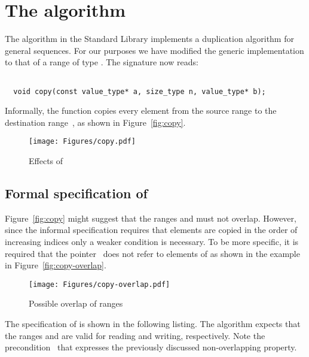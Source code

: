 
\section{The \copyi algorithm}

The \copyi  algorithm in the \cxx Standard Library \cite[\S 28.6.1]{cxx-17-draft} implements
a duplication algorithm for general sequences.
For our purposes we have modified
the generic implementation
to that of a range of type .
The signature now reads:

\begin{lstlisting}[style=acsl-block]

  void copy(const value_type* a, size_type n, value_type* b);
\end{lstlisting}

Informally, the function copies every element from the source range  to the
destination range~, as shown in Figure~\ref{fig:copy}.

\begin{figure}[hbt]
\centering
\texttt{[image: Figures/copy.pdf]}
\caption{ Effects of \copyi}
\end{figure}

\subsection{Formal specification of \copyi}

Figure~\ref{fig:copy} might suggest that the ranges  and 
must not overlap.
However, since the informal specification requires that elements are copied in the
order of increasing indices only a weaker condition is necessary.
To be more specific, it is required that the pointer~ does not refer
to elements of  as shown in the example in Figure~\ref{fig:copy-overlap}.

\begin{figure}[hbt]
\centering
\texttt{[image: Figures/copy-overlap.pdf]}
\caption{ Possible overlap of \copyi ranges}
\end{figure}

\FloatBarrier

The specification of \copyi is shown in the following listing.
The \copyi algorithm expects that the ranges  and  are valid for reading
and writing, respectively.
Note the precondition~ that expresses the previously discussed non-overlapping property.

